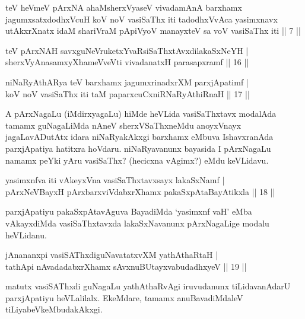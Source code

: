 \begin{kandikeshl}
teV heVmeV pArxNA ahaMsherxVyaseV vivadamAnA barxhamx jagumxsatxdodhxVcuH koV noV vasiSaThx iti tadodhxVvAca yasimxnavx utAkxrXnatx idaM shariVraM pApiVyoV manayxteV sa voV vasiSaThx iti || 7 ||
\end{kandikeshl}


\begin{shl}
teV pArxNAH savxguNeVruketxYvaRsiSaThxtAvxdilakaSxNeYH | \\
sherxVyAnasamxyXhameVveVti vivadanatxH parasapxramf \hfill|| 16 || 
\end{shl}

\begin{shl}
niNaRyAthARya teV barxhamx jagumxrinadxrXM parxjApatimf | \\
koV noV vasiSaThx iti taM paparxcuCxniRNaRyAthiRnaH \hfill|| 17 || 
\end{shl}

\begin{artha}
A pArxNagaLu (iMdirxyagaLu) hiMde heVLida vasiSaThxtavx modalAda 
tamamx guNagaLiMda nAneV sherxVSaThxneMdu anoyxVnayx jagaLavADutAtx 
idara niNaRyakAkxgi barxhamx eMbuva IshavxranAda parxjApatiya hatitxra 
hoVdaru. niNaRyavanunx bayasida I pArxNagaLu namamx peYki yAru 
vasiSaThx? (hecicxna vAgimx?) eMdu keVLidavu.
\end{artha}


\begin{shl}
yasimxnfva iti vAkeyxVna vasiSaThxtavxsayx lakaSxNamf | \\
pArxNeVBayxH pArxbarxviVdabxrXhamx pakaSxpAtaBayAtikxla \hfill|| 18 || 
\end{shl}


\begin{artha}
parxjApatiyu pakaSxpAtavAguva BayadiMda `yasimxnf vaH' eMba vAkayxdiMda vasiSaThxtavxda lakaSxNavanunx pArxNagaLige modalu heVLidanu.
\end{artha}

\begin{shl}
jAnananxpi vasiSAThxdiguNavatatxvXM yathAthaRtaH | \\
tathA\s pi nAvadadabxrXhamx sAvxnuBUtayxvabudadhxyeV \hfill|| 19 || 
\end{shl}

\begin{artha}
matutx vasiSAThxdi guNagaLu yathAthaRvAgi iruvudanunx tiLidavanAdarU 
parxjApatiyu heVLalilalx. EkeMdare, tamamx anuBavadiMdaleV 
tiLiyabeVkeMbudakAkxgi.
\end{artha}

